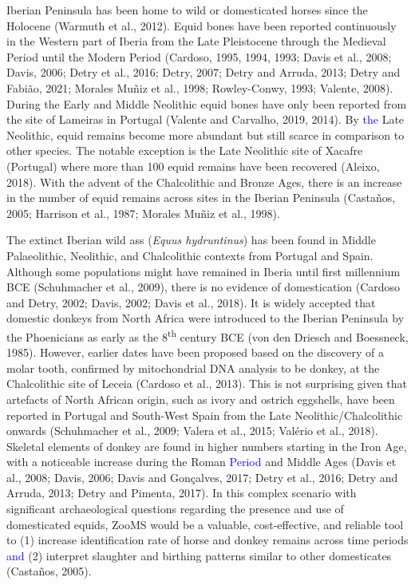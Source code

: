 \documentclass[preprint, 3p, authoryear]{elsarticle} %
\begin{document}
Iberian Peninsula has been home to wild or domesticated horses since the Holocene (Warmuth et al., 2012). Equid bones have been reported continuously in the Western part of Iberia from the Late Pleistocene through the Medieval Period until the Modern Period (Cardoso, 1995, 1994, 1993; Davis et al., 2008; Davis, 2006; Detry et al., 2016; Detry, 2007; Detry and Arruda, 2013; Detry and Fabião, 2021; Morales Muñiz et al., 1998; Rowley-Conwy, 1993; Valente, 2008). During the Early and Middle Neolithic equid bones have only been reported from the site of Lameiras in Portugal (Valente and Carvalho, 2019, 2014). By \textcolor{blue}{the} Late Neolithic, equid remains become more abundant but still scarce in comparison to other species. The notable exception is the Late Neolithic site of Xacafre (Portugal) where more than 100 equid remains have been recovered (Aleixo, 2018). With the advent of the Chalcolithic and Bronze Ages, there is an increase in the number of equid remains across sites in the Iberian Peninsula (Castaños, 2005; Harrison et al., 1987; Morales Muñiz et al., 1998).

The extinct Iberian wild ass (\emph{Equus hydruntinus}) has been found in Middle Palaeolithic, Neolithic, and Chalcolithic contexts from Portugal and Spain. Although some populations might have remained in Iberia until first millennium BCE (Schuhmacher et al., 2009), there is no evidence of domestication (Cardoso and Detry, 2002; Davis, 2002; Davis et al., 2018). It is widely accepted that domestic donkeys from North Africa were introduced to the Iberian Peninsula by the Phoenicians as early as the 8\textsuperscript{th} century BCE (von den Driesch and Boessneck, 1985). However, earlier dates have been proposed based on the discovery of a molar tooth, confirmed by mitochondrial DNA analysis to be donkey, at the Chalcolithic site of Leceia (Cardoso et al., 2013). This is not surprising given that artefacts of North African origin, such as ivory and ostrich eggshells, have been reported in Portugal and South-West Spain from the Late Neolithic/Chalcolithic onwards (Schuhmacher et al., 2009; Valera et al., 2015; Valério et al., 2018). Skeletal elements of donkey are found in higher numbers starting in the Iron Age, with a noticeable increase during the Roman \textcolor{blue}{Period} and Middle Ages (Davis et al., 2008; Davis, 2006; Davis and Gonçalves, 2017; Detry et al., 2016; Detry and Arruda, 2013; Detry and Pimenta, 2017). In this complex scenario with significant archaeological questions regarding the presence and use of domesticated equids, ZooMS would be a valuable, cost-effective, and reliable tool to (1) increase identification rate of horse and donkey remains across time periods \textcolor{blue}{and} (2) interpret slaughter and birthing patterns similar to other domesticates (Castaños, 2005).
\end{document}
